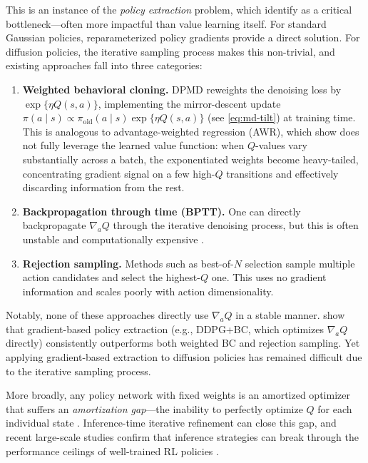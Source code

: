 \documentclass{article}
\theoremstyle{plain}
\theoremstyle{definition}
\theoremstyle{remark}
\begin{document}
This is an instance of the \emph{policy extraction} problem, which \citet{park2024bottleneck} identify as a critical bottleneck---often more impactful than value learning itself.
For standard Gaussian policies, reparameterized policy gradients provide a direct solution.
For diffusion policies, the iterative sampling process makes this non-trivial, and existing approaches fall into three categories:
\begin{enumerate}
  \item \textbf{Weighted behavioral cloning.} DPMD \citep{ma2025soft} reweights the denoising loss by $\exp\{\eta Q(s,a)\}$, implementing the mirror-descent update $\pi(a\mid s) \propto \pi_\mathrm{old}(a\mid s) \exp\{\eta Q(s,a)\}$ (see \cref{eq:md-tilt}) at training time. This is analogous to advantage-weighted regression (AWR), which \citet{park2024bottleneck} show does not fully leverage the learned value function: when $Q$-values vary substantially across a batch, the exponentiated weights become heavy-tailed, concentrating gradient signal on a few high-$Q$ transitions and effectively discarding information from the rest.
  \item \textbf{Backpropagation through time (BPTT).} One can directly backpropagate $\nabla_a Q$ through the iterative denoising process, but this is often unstable and computationally expensive \citep{park2025fql}.
  \item \textbf{Rejection sampling.} Methods such as best-of-$N$ selection \citep{ma2025soft,espinosa2025evor} sample multiple action candidates and select the highest-$Q$ one. This uses no gradient information and scales poorly with action dimensionality.
\end{enumerate}

\noindent Notably, none of these approaches directly use $\nabla_a Q$ in a stable manner. \citet{park2024bottleneck} show that gradient-based policy extraction (e.g., DDPG+BC, which optimizes $\nabla_a Q$ directly) consistently outperforms both weighted BC and rejection sampling. Yet applying gradient-based extraction to diffusion policies has remained difficult due to the iterative sampling process.

More broadly, any policy network with fixed weights is an amortized optimizer that suffers an \emph{amortization gap}---the inability to perfectly optimize $Q$ for each individual state \citep{marino2021iterative}. Inference-time iterative refinement can close this gap, and recent large-scale studies confirm that inference strategies can break through the performance ceilings of well-trained RL policies \citep{chalumeau2025breaking}.
\end{document}
